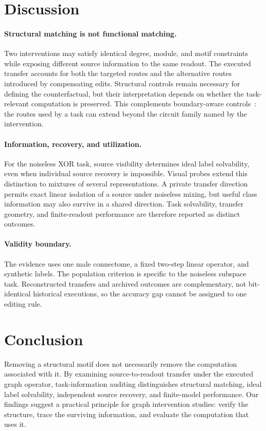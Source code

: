 \section{Discussion}
\label{sec:discussion}

\paragraph{Structural matching is not functional matching.}
Two interventions may satisfy identical degree, module, and motif constraints
while exposing different source information to the same readout. The executed
transfer accounts for both the targeted routes and the alternative routes
introduced by compensating edits. Structural controls remain necessary for
defining the counterfactual, but their interpretation depends on whether the
task-relevant computation is preserved. This complements boundary-aware
controls~\cite{park2026}: the routes used by a task can extend beyond the
circuit family named by the intervention.

\paragraph{Information, recovery, and utilization.}
For the noiseless XOR task, source visibility determines ideal label
solvability, even when individual source recovery is impossible. Visual
probes extend this distinction to mixtures of several representations. A
private transfer direction permits exact linear isolation of a source under
noiseless mixing, but useful class information may also survive in a shared
direction. Task solvability, transfer geometry, and finite-readout
performance are therefore reported as distinct outcomes.

\paragraph{Validity boundary.}
The evidence uses one male connectome, a fixed two-step linear operator,
and synthetic labels. The population criterion is specific to the noiseless
subspace task. Reconstructed transfers and archived outcomes are complementary,
not bit-identical historical executions, so the accuracy gap cannot be
assigned to one editing rule.

\section{Conclusion}
\label{sec:conclusion}

Removing a structural motif does not necessarily remove the computation
associated with it. By examining source-to-readout transfer under the
executed graph operator, task-information auditing distinguishes structural
matching, ideal label solvability, independent source recovery, and
finite-model performance. Our findings suggest a practical principle for
graph intervention studies: verify the structure, trace the surviving
information, and evaluate the computation that uses it.
